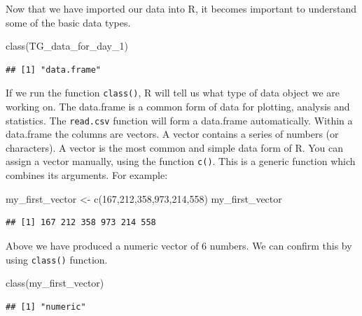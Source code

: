 \documentclass[
]{book}
\newenvironment{Shaded}{\begin{snugshade}}{\end{snugshade}}
\newcommand{\DecValTok}[1]{\textcolor[rgb]{0.00,0.00,0.81}{#1}}
\newcommand{\FunctionTok}[1]{\textcolor[rgb]{0.00,0.00,0.00}{#1}}
\newcommand{\NormalTok}[1]{#1}
\newcommand{\OtherTok}[1]{\textcolor[rgb]{0.56,0.35,0.01}{#1}}
\begin{document}
Now that we have imported our data into R, it becomes important to understand some of the basic data types.

\begin{Shaded}
\begin{Highlighting}[]
\FunctionTok{class}\NormalTok{(TG\_data\_for\_day\_1)}
\end{Highlighting}
\end{Shaded}

\begin{verbatim}
## [1] "data.frame"
\end{verbatim}

If we run the function \texttt{class()}, R will tell us what type of data object we are working on. The data.frame is a common form of data for plotting, analysis and statistics. The \texttt{read.csv} function will form a data.frame automatically. Within a data.frame the columns are vectors. A vector contains a series of numbers (or characters). A vector is the most common and simple data form of R. You can assign a vector manually, using the function \texttt{c()}. This is a generic function which combines its arguments. For example:

\begin{Shaded}
\begin{Highlighting}[]
\NormalTok{my\_first\_vector }\OtherTok{\textless{}{-}} \FunctionTok{c}\NormalTok{(}\DecValTok{167}\NormalTok{,}\DecValTok{212}\NormalTok{,}\DecValTok{358}\NormalTok{,}\DecValTok{973}\NormalTok{,}\DecValTok{214}\NormalTok{,}\DecValTok{558}\NormalTok{)}
\NormalTok{my\_first\_vector}
\end{Highlighting}
\end{Shaded}

\begin{verbatim}
## [1] 167 212 358 973 214 558
\end{verbatim}

Above we have produced a numeric vector of 6 numbers. We can confirm this by using \texttt{class()} function.

\begin{Shaded}
\begin{Highlighting}[]
\FunctionTok{class}\NormalTok{(my\_first\_vector)}
\end{Highlighting}
\end{Shaded}

\begin{verbatim}
## [1] "numeric"
\end{verbatim}
\end{document}
